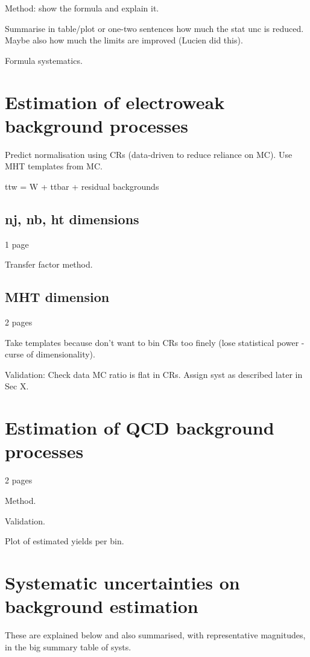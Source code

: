 Method: show the formula and explain it.

Summarise in table/plot or one-two sentences how much the stat unc is reduced. 
Maybe also how much the limits are improved (Lucien did this).

Formula systematics.

\section{Estimation of electroweak background processes}
\label{sec:analysis-estimation-ewk}
Predict normalisation using CRs (data-driven to reduce reliance on MC). Use MHT 
templates from MC.

ttw = W + ttbar + residual backgrounds

\subsection{nj, nb, ht dimensions}
1 page

Transfer factor method.

\subsection{MHT dimension}
2 pages

Take templates because don't want to bin CRs too finely (lose statistical power 
- curse of dimensionality).

Validation: Check data MC ratio is flat in CRs. Assign syst as described later 
in Sec X.

\section{Estimation of QCD background processes}
\label{sec:analysis-estimation-qcd}
2 pages

Method.

Validation.

Plot of estimated yields per bin.

\section{Systematic uncertainties on background estimation}

These are explained below and also summarised, with representative magnitudes, 
in the big summary table of systs.

